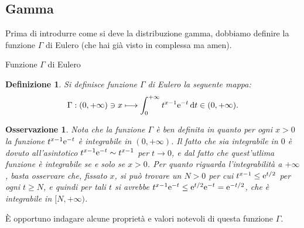 \documentclass[11pt]{book}
\theoremstyle{Definizione}
\newtheorem*{mydef}{Definizione}
\theoremstyle{TeoremaProposizioneLemmaCorollario}
\theoremstyle{OsservazioneNota}
\newtheorem{myobs}{Osservazione}[section]
\renewcommand{\d}{\mathrm{d}}
\newcommand{\dt}{\,\d t}
\newcommand{\e}{\textup{e}}
\begin{document}
\subsection{Gamma}
Prima di introdurre come si deve la distribuzione gamma, dobbiamo definire la funzione $\Gamma$ di Eulero (che hai già visto in complessa ma amen).
\begin{boxdef}{Funzione $\Gamma$ di Eulero}
\begin{mydef}
Si definisce funzione $\Gamma$ di Eulero la seguente mappa:
$$
\Gamma: (0,+\infty) \ni x \longmapsto \int_0^{+\infty} t^{x-1} \e^{-t}\dt\in (0,+\infty).
$$
\end{mydef}
\end{boxdef}
\begin{myobs}
Nota che la funzione $\Gamma$ è ben definita in quanto per ogni $x > 0$ la funzione $t^{x-1}\e^{-t}$ è integrabile in $(0,+\infty)$. Il fatto che sia integrabile in $0$ è dovuto all'asintotico $t^{x-1}\e^{-t} \sim t^{x-1}$ per $t \to 0$, e dal fatto che quest'utlima funzione è integrabile se e solo se $x > 0$. Per quanto riguarda l'integrabilità a $+\infty$, basta osservare che, fissato $x$, si può trovare un $N > 0$ per cui $t^{x-1}\leq \e^{t/2}$ per ogni $t \geq N$, e quindi per tali $t$ si avrebbe $t^{x-1}\e^{-t} \leq \e^{t/2}\e^{-t} = \e^{-t/2}$, che è integrabile in $[N,+\infty)$.
\end{myobs}
È opportuno indagare alcune proprietà e valori notevoli di questa funzione $\Gamma$.
\end{document}
